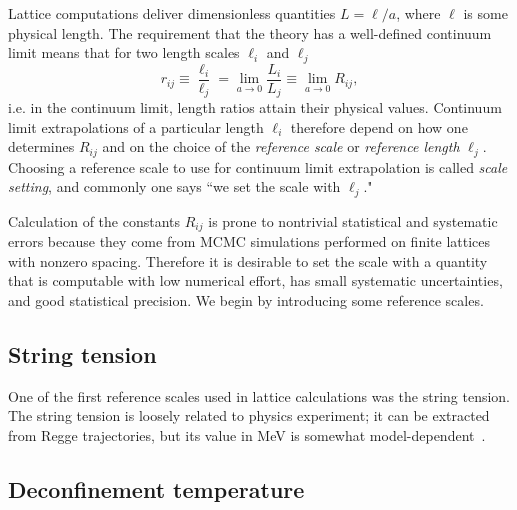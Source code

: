 Lattice computations deliver dimensionless quantities $L=\ell/a$, where 
$\ell$ is some physical length. The requirement that the theory has a 
well-defined continuum limit means that for two length scales 
$\ell_i$ and $\ell_j$
\begin{equation}
  r_{ij}\equiv\frac{\ell_i}{\ell_j}=\lim_{a\to 0}\frac{L_i}{L_j}
        \equiv\lim_{a\to 0}R_{ij},
\end{equation}
i.e. in the continuum limit, length ratios attain their physical values.
Continuum limit extrapolations of a particular length $\ell_i$ therefore
depend on how one determines $R_{ij}$ and on the choice of the
{\it reference scale} or {\it reference length} $\ell_j$. 
Choosing a reference scale to use for continuum limit extrapolation
is called {\it scale setting}, and commonly one says
``we set the scale with $\ell_j$."


Calculation of the constants $R_{ij}$ is prone to nontrivial statistical and
systematic errors because they come from MCMC simulations performed on 
finite lattices with nonzero spacing. Therefore it is desirable to set
the scale with a quantity that is computable with low numerical effort,
has small systematic uncertainties, and good statistical precision.
We begin by introducing some reference scales. 


\subsection{String tension}


One of the first reference scales used in lattice calculations was the string
tension. The string tension is loosely related to physics experiment; it can be
extracted from Regge trajectories, but its value in MeV is somewhat
model-dependent~\cite{smit_introduction_2002}.


\subsection{Deconfinement temperature}


